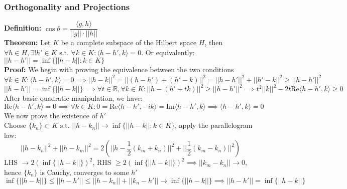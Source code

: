 \documentclass{article}
\newcommand{\R}{\mathbb{R}}
\newcommand{\st}{\mbox{ s.t. }}
\newcommand{\0}{{\bf{0}}}
\newcommand{\1}{{\bf{1}}}
\begin{document}
\subsubsection{Orthogonality and Projections}
\textbf{Definition:} $\cos\theta=\dfrac{\langle g,h\rangle}{||g||\cdot||h||}$\\
\textbf{Theorem:} Let $K$ be a complete subspace of the Hilbert space $H$, then $\forall h\in H,\exists! h'\in K\st\forall k\in K:\langle h-h',k\rangle=0$. Or equivalently: $||h-h'||=\inf\{||h-k||:k\in K\}$\\
\textbf{Proof:} We begin with proving the equivalence between the two conditions
$$\forall k\in K:\langle h-h',k\rangle=0\implies||h-k||^2=||(h-h')+(h'-k)||^2=||h-h'||^2+||h'-k||^2\geq||h-h'||^2$$
$$||h-h'||=\inf\{||h-k||\}\implies\forall t\in\R,\forall k\in K:||h-(h'+tk)||^2\geq||h-h'||^2\implies t^2||k||^2-2t\mbox{Re}\langle h-h',k\rangle\geq0$$
After basic quadratic manipulation, we have: 
$$\mbox{Re}\langle h-h',k\rangle=0\implies\forall k\in K:0=\mbox{Re}\langle h-h',-ik\rangle=\mbox{Im}\langle h-h',k\rangle\implies\langle h-h',k\rangle=0$$
We now prove the existence of $h'$\\
Choose $\{k_n\}\subset K\st||h-k_n||\to\inf\{||h-k||:k\in K\}$, apply the parallelogram law:
$$||h-k_n||^2+||h-k_m||^2=2\left(||h-\frac{1}{2}(k_m+k_n)||^2+||\frac{1}{2}(k_m-k_n)||^2\right)$$
LHS $\to2(\inf\{||h-k||\})^2$, RHS $\geq2(\inf\{||h-k||\})^2\implies||k_m-k_n||\to0$, hence $\{k_n\}$ is Cauchy, converges to some $h'$
$$\inf\{||h-k||\}\le||h-h'||\le||h-k_n||+||k_n-h'||\to\inf\{||h-k||\}\implies||h-h'||=\inf\{||h-k||\}$$
\end{document}
